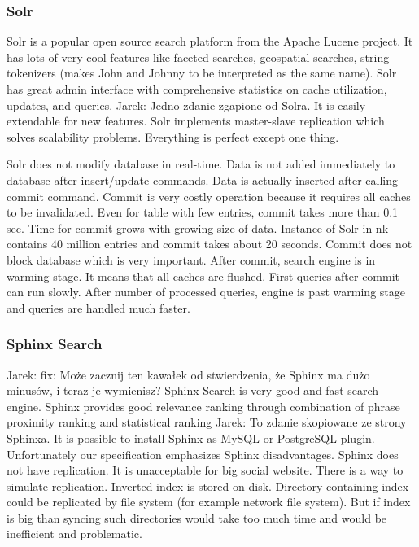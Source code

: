 \documentclass[10pt,a4paper]{article}
\newcommand{\jarek}[1]{\noindent\colorbox{myYellow}{Jarek: #1}}
\begin{document}
\subsubsection{Solr}

Solr is a popular open source search platform from the Apache Lucene project. It has lots of very cool features like faceted searches, geospatial searches, string tokenizers (makes John and Johnny to be interpreted as the same name). Solr has great admin interface with comprehensive statistics on cache utilization, updates, and queries. \jarek{Jedno zdanie zgapione od Solra}. It is easily extendable for new features. Solr implements master-slave replication which solves scalability problems. Everything is perfect except one thing. 

Solr does not modify database in real-time. Data is not added immediately to database after insert/update commands. Data is actually inserted after calling commit command. Commit is very costly operation because it requires all caches to be invalidated. Even for table with few entries, commit takes more than 0.1 sec. Time for commit grows with growing size of data. Instance of Solr in nk contains 40 million entries and commit takes about 20 seconds. Commit does not block database which is very important. After commit, search engine is in warming stage. It means that all caches are flushed. First queries after commit can run slowly. After number of processed queries, engine is past warming stage and queries are handled much faster.

\subsubsection{Sphinx Search}

\jarek{fix: Może zacznij ten kawałek od stwierdzenia, że Sphinx ma dużo minusów, i teraz je wymienisz?}
Sphinx Search is very good and fast search engine. Sphinx provides good relevance ranking through combination of phrase proximity ranking and statistical ranking \jarek{To zdanie skopiowane ze strony Sphinxa}. It is possible to install Sphinx as MySQL or PostgreSQL plugin. Unfortunately our specification emphasizes Sphinx disadvantages.
Sphinx does not have replication. It is unacceptable for big social website. There is a way to simulate replication. Inverted index is stored on disk. Directory containing index could be replicated by file system (for example network file system). But if index is big than syncing such directories would take too much time and would be inefficient and problematic.
\end{document}
